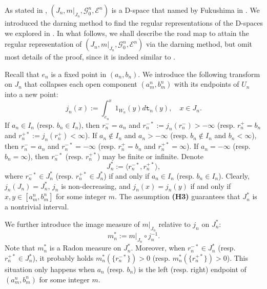 \documentclass[a4paper]{amsart}
\theoremstyle{definition}
\theoremstyle{remark}
\numberwithin{equation}{section}
\begin{document}
As stated in \cite[\S3.2]{LY14}, $(J_n, m|_{J_n}, \mathcal{G}^n_0, {{\mathcal{E}}}^n)$ is a D-space that named by Fukushima in \cite{F71}. We introduced the darning method to find the regular representations of the D-spaces we explored in \cite{LY14}. In what follows, we shall describe the road map to attain the regular representation of $(J_n, m|_{J_n}, \mathcal{G}^n_0, {{\mathcal{E}}}^n)$ via the darning method, but omit most details of the proof, since it is indeed similar to \cite{LY14}.

Recall that $e_n$ is a fixed point in $(a_n,b_n)$. We introduce the following transform on $J_n$ that collapses each open component $(a^n_m,b^n_m)$ with its endpoints of $U_n$ into a new point:
\[
	j_n(x):=\int_{e_n}^x 1_{W_n}(y)d{{\mathtt{t}}}_n(y),\quad x\in J_n.
\]
If $a_n\in I_n$ (resp. $b_n\in I_n$), then $r^-_n=a_n$ and $r^{-*}_n:=j_n(r^-_n)>-\infty$ (resp. $r^+_n=b_n$ and $r^{+*}_n:=j_n(r^+_n)<\infty$). If $a_n\notin I_n$ and $a_n>-\infty$ (resp. $b_n\notin I_n$ and $b_n<\infty$), then $r^-_n=a_n$ and $r^{-*}_n=-\infty$ (resp. $r^+_n=b_n$ and $r^{+*}_n=\infty$). If $a_n=-\infty$ (resp. $b_n=\infty$), then $r^{-*}_n$ (resp. $r^{+*}_n$) may be finite or infinite. Denote
\[
	J^*_n:= \langle r^{-*}_n, r^{+*}_n\rangle,
\]
where $r^{-*}_n\in J^*_n$ (resp. $r^{+*}_n\in J^*_n$) if and only if $a_n\in I_n$ (resp. $b_n\in I_n$). Clearly, $j_n(J_n)=J^*_n$, $j_n$ is non-decreasing, and $j_n(x)=j_n(y)$ if and only if $x,y\in [a_m^n,b_m^n]$ for some integer $m$. The assumption \textbf{(H3)} guarantees that $J^*_n$ is a nontrivial interval.

We further introduce the image measure of $m|_{J_n}$ relative to $j_n$ on $J^*_n$:
\[
	m^*_n:= m|_{J_n}\circ j_n^{-1}.
\]
Note that $m^*_n$ is a Radon measure on $J^*_n$. Moreover, when $r^{-*}_n\in J^*_n$ (resp. $r^{+*}_n\in J^*_n$), it probably holds $m^*_n(\{r^{-*}_n\})>0$ (resp. $m^*_n(\{r^{+*}_n\})>0$). This situation only happens when $a_n$ (resp. $b_n$) is the left (resp. right) endpoint of $(a^n_m, b^n_m)$ for some integer $m$.
\end{document}
